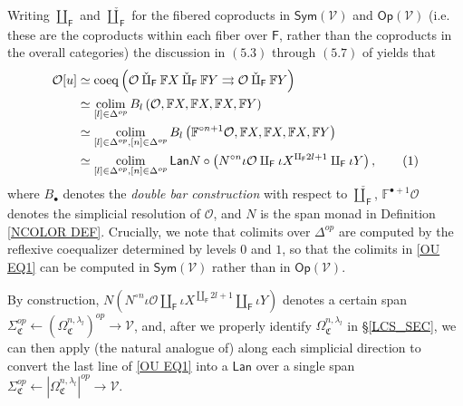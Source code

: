 \documentclass[a4paper,10pt
,draft
]{article}%
\numberwithin{equation}{section}
\numberwithin{figure}{section}
\theoremstyle{definition} %
\DeclareMathOperator{\colim}{colim}%
\renewcommand{\O}{\ensuremath{\mathcal O}}
\newcommand{\1}{\ensuremath{\mathbbm 1}}%
\begin{document}
Writing $\amalg_{\mathsf{F}}$ and $\mathbin{\check\amalg}_{\mathsf{F}}$
for the fibered coproducts in 
$\mathsf{Sym}(\mathcal{V})$ and
$\mathsf{Op}(\mathcal{V})$
(i.e. these are the coproducts within each fiber over $\mathsf{F}$, rather than the coproducts in the overall categories)
the discussion in $(5.3)$ through $(5.7)$ of \cite{BP_geo}
yields that
\begin{align*}
  \O[u]
  &
    \simeq \mathrm{coeq}\left(
          \O \mathbin{\check\amalg_{\mathsf{F}}} \mathbb F X \mathbin{\check\amalg}_{\mathsf{F}} \mathbb F Y \rightrightarrows \O \mathbin{\check\amalg}_{\mathsf{F}} \mathbb F Y
          \right)
  \\
  &
    \simeq \colim_{[l] \in \Delta^{op}} 
    B_l \left( \O, \mathbb F X, \mathbb F X, \mathbb F X, \mathbb FY \right)
  \\
  &
    \simeq \colim_{[l] \in \Delta^{op},[n] \in \Delta^{op}} 
    B_l \left( \mathbb F^{\circ n+1} \O, \mathbb F X, \mathbb F X, \mathbb F X, \mathbb FY \right)
  \\
  &
    \simeq \colim_{[l] \in \Delta^{op},[n] \in \Delta^{op}} 
    \mathsf{Lan} N \circ \left( N^{\circ n} \iota \O \amalg_{\mathsf{F}} \iota X^{\amalg_{\mathsf{F}} 2l +1} \amalg_{\mathsf{F}} \iota Y \right),
    \stepcounter{equation}\tag{\theequation}\label{OU EQ1}
\end{align*}
where $B_{\bullet}$ denotes the \textit{double bar construction}
with respect to $\mathbin{\check\amalg}_{\mathsf{F}}$,
$\mathbb{F}^{\bullet +1} \mathcal{O}$ denotes the simplicial resolution of $\mathcal{O}$, 
and $N$ is the span monad in Definition \ref{NCOLOR DEF}.
Crucially, we note that colimits over $\Delta^{op}$
are computed by the reflexive coequalizer determined by levels $0$ and $1$, 
so that the colimits in \eqref{OU EQ1}
can be computed in $\mathsf{Sym}(\mathcal{V})$
rather than in $\mathsf{Op}(\mathcal{V})$.


By construction,
$N \left(N^{\circ n} \iota \O \amalg_{\mathsf{F}} \iota X^{\amalg_{\mathsf{F}} 2l +1}\amalg_{\mathsf{F}} \iota Y \right)$
denotes a certain span
$\Sigma_{\mathfrak{C}}^{op} \leftarrow 
\left(\Omega^{n,\lambda_l}_{\mathfrak{C}}\right)^{op} \to \mathcal{V}$,
and, after we properly identify $\Omega_{\mathfrak C}^{n, \lambda_l}$ in \S \ref{LCS_SEC},
we can then apply (the natural analogue of)
\cite[Prop. 5.37]{BP_geo}
along each simplicial direction
to convert the last line of \eqref{OU EQ1}
into a $\mathsf{Lan}$
over a single span
$\Sigma_{\mathfrak{C}}^{op} \leftarrow 
\left|\Omega^{n,\lambda_l}_{\mathfrak{C}}\right|^{op} \to \mathcal{V}$.
\end{document}
